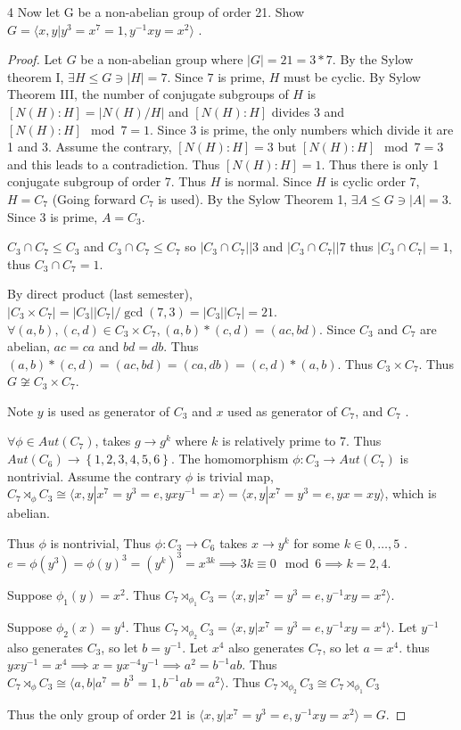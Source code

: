 \documentclass{article}
\newcommand{\angles}[1]{\langle #1 \rangle}
\begin{document}
\bigskip

\begin{claim}{4}\label{Claim 4.}
    Now let G be a non-abelian group of order 21. Show $G = \angles{x,y| y^3=x^7=1, y^{-1}xy = x^2}$ .
\end{claim}
\begin{proof}
    Let $G$ be a non-abelian group where $|G| = 21 = 3 * 7$. By the Sylow theorem I, $\exists H \leq G \ni |H| = 7$. Since $7$ is prime, $H$ must be cyclic. By Sylow Theorem III, the number of conjugate subgroups of $H$ is $[N(H) : H] = |N(H) / H|$ and $[N(H) : H]$ divides 3 and $[N(H) : H] \mod 7 = 1$. Since 3 is prime, the only numbers which divide it are 1 and 3. Assume the contrary, $[N(H) : H] = 3$ but $[N(H) : H] \mod 7 = 3$ and this leads to a contradiction. Thus $[N(H) : H]=1$. Thus there is only 1 conjugate subgroup of order 7. Thus $H$ is normal. Since $H$ is cyclic order 7, $H = C_7$ (Going forward $C_7$ is used). By the Sylow Theorem 1, $\exists A \leq G \ni |A| =3$. Since $3$ is prime, $A = C_3$. 

    $C_3 \cap C_7 \leq C_3$ and $C_3 \cap C_7 \leq C_7$ so $|C_3 \cap C_7| | 3$ and $|C_3 \cap C_7| | 7$ thus $|C_3 \cap C_7 |= 1$, thus $C_3 \cap C_7 = 1$.     
    
    By direct product (last semester), $|C_3 \times C_7| = |C_3||C_7|/\gcd(7, 3) = |C_3||C_7|=21$. $\forall (a, b), (c,d) \in C_3 \times C_7, (a, b) * (c, d) = (ac, bd)$. Since $C_3$ and $C_7$ are abelian, $ac = ca$ and $bd= db$. Thus $(a, b) * (c, d) = (ac, bd) = (ca, db) = (c,d)*(a, b)$. Thus $C_3 \times C_7$. Thus $G \not \cong C_3 \times C_7$. 

    Note $y$ is used as generator of $C_3$ and $x$ used as generator of $C_7$, and $C_7$ .    
    
    $\forall \phi \in Aut(C_7)$, takes $g \to g^k$ where $k$ is relatively prime to 7.  Thus $Aut(C_6) \to \left\{ 1, 2, 3, 4,5,6 \right\}$. The homomorphism $\phi: C_3 \to Aut(C_7)$ is nontrivial. Assume the contrary $\phi$ is trivial map, $C_7 \rtimes_\phi C_3 \cong \angles{x, y | x^7= y^3 = e, yxy^{-1} = x} = \angles{x, y | x^7= y^3 = e, yx = xy}$, which is abelian. 
    
    Thus $\phi$ is nontrivial, Thus $\phi: C_3 \to C_6$ takes $x \to y^k$ for some $k \in {0, \dots, 5}$ . $e = \phi(y^3) = \phi(y)^3 = (y^k)^3 = x^{3k} \implies 3k \equiv 0 \mod 6 \implies k = 2, 4$. 
    
    Suppose $\phi_1(y) = x^2$. Thus $C_7 \rtimes_{\phi_1} C_3 = \angles{x, y | x^7 = y^3 = e, y^{-1}xy = x^2}$. 
    
    Suppose $\phi_2(x) = y^4$. Thus $C_7 \rtimes_{\phi_2} C_3 = \angles{x, y | x^7 = y^3 = e, y^{-1}xy = x^4}$. Let $y^{-1}$ also generates $C_3$, so let $b = y^{-1}$. Let $x^4$ also generates $C_7$, so let $a = x^4$. thus $yxy^{-1} = x^4 \implies x = yx^{-4}y^{-1} \implies a^2 = b^{-1}ab$. Thus $C_7 \rtimes_\phi C_3 \cong \angles{a, b | a^7 = b^3 = 1, b^{-1}ab = a^2}$. Thus $C_7 \rtimes_{\phi_2} C_3 \cong C_7 \rtimes_{\phi_1} C_3$          
    
    Thus the only group of order 21 is $\angles{x, y | x^7 = y^3 = e, y^{-1}xy = x^2} = G$.      
\end{proof}
\end{document}

